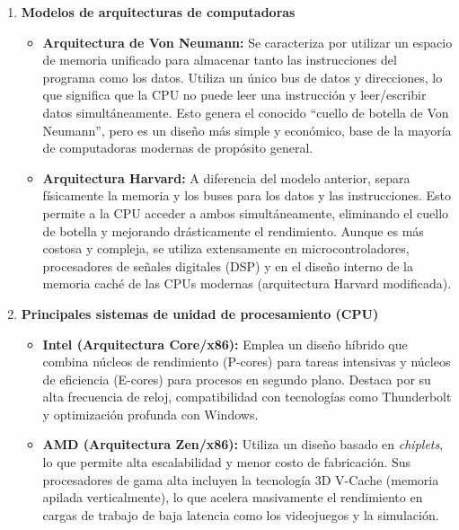 \documentclass[10pt]{article}
\begin{document}
\begin{enumerate}

    \item \textbf{Modelos de arquitecturas de computadoras}

    \begin{itemize}
        \item \textbf{Arquitectura de Von Neumann:} Se caracteriza por utilizar un espacio de memoria unificado para almacenar tanto las instrucciones del programa como los datos. Utiliza un único bus de datos y direcciones, lo que significa que la CPU no puede leer una instrucción y leer/escribir datos simultáneamente. Esto genera el conocido ``cuello de botella de Von Neumann'', pero es un diseño más simple y económico, base de la mayoría de computadoras modernas de propósito general.

        \item \textbf{Arquitectura Harvard:} A diferencia del modelo anterior, separa físicamente la memoria y los buses para los datos y las instrucciones. Esto permite a la CPU acceder a ambos simultáneamente, eliminando el cuello de botella y mejorando drásticamente el rendimiento. Aunque es más costosa y compleja, se utiliza extensamente en microcontroladores, procesadores de señales digitales (DSP) y en el diseño interno de la memoria caché de las CPUs modernas (arquitectura Harvard modificada).
    \end{itemize}


    \item \textbf{Principales sistemas de unidad de procesamiento (CPU)}

    \begin{itemize}
        \item \textbf{Intel (Arquitectura Core/x86):} Emplea un diseño híbrido que combina núcleos de rendimiento (P-cores) para tareas intensivas y núcleos de eficiencia (E-cores) para procesos en segundo plano. Destaca por su alta frecuencia de reloj, compatibilidad con tecnologías como Thunderbolt y optimización profunda con Windows.

        \item \textbf{AMD (Arquitectura Zen/x86):} Utiliza un diseño basado en \textit{chiplets}, lo que permite alta escalabilidad y menor costo de fabricación. Sus procesadores de gama alta incluyen la tecnología 3D V-Cache (memoria apilada verticalmente), lo que acelera masivamente el rendimiento en cargas de trabajo de baja latencia como los videojuegos y la simulación.


\end{itemize}
\end{enumerate}
\end{document}

